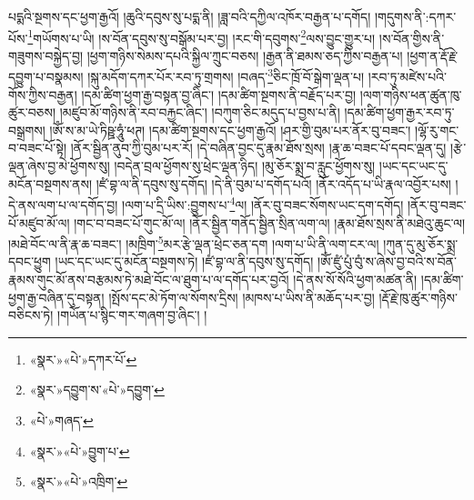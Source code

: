 པདྨའི་སྔགས་དང་ཕྱག་རྒྱའོ། །ཆུའི་དབུས་སུ་པདྨ་ནི། །ཟླ་བའི་དཀྱིལ་འཁོར་བརྒྱན་པ་དགོད། །གདུགས་ནི་:དཀར་པོས་\footnote{«སྣར་»«པེ་»དཀར་པོ་}གཡོགས་པ་ཡི། །ས་བོན་དབུས་སུ་བསྒོམ་པར་བྱ། །རང་གི་དབུགས་\footnote{«སྣར་»དབྱུག་ས་«པེ་»དབྱུག་}ལས་བྱུང་གྱུར་པ། །ས་བོན་གྱིས་ནི་གཟུགས་བསྐྱེད་བྱ། །ཕྱག་གཉིས་སེམས་དཔའི་སྐྱིལ་ཀྲུང་བཅས། །རྒྱན་ནི་ཐམས་ཅད་ཀྱིས་བརྒྱན་པ། །ཕྱག་ན་རྡོ་རྗེ་དབྱུག་པ་བསྣམས། །སྐུ་མདོག་དཀར་པོར་རབ་ཏུ་གྲགས། །བཞད་\footnote{«པེ་»གཞད་}ཅིང་ཁྲོ་བོ་སྒེག་ལྡན་པ། །རབ་ཏུ་མཛེས་པའི་གོས་ཀྱིས་བརྒྱན། །དམ་ཚིག་ཕྱག་རྒྱ་བསྟན་བྱ་ཞིང་། །དམ་ཚིག་སྔགས་ནི་བརྗོད་པར་བྱ། །ལག་གཉིས་ཕན་ཚུན་ཁུ་ཚུར་བཅས། །མཛུབ་མོ་གཉིས་ནི་རབ་བརྐྱང་ཞིང་། །བཀུག་ཅིང་མདུད་པ་བྱས་པ་ནི། །དམ་ཚིག་ཕྱག་རྒྱར་རབ་ཏུ་བསྒྲགས། །ཨོཾ་ས་མ་ཡེ་ཏིཥྛ་ཧཱུཾ་ཕཊ། །དམ་ཚིག་སྔགས་དང་ཕྱག་རྒྱའོ། །ཤར་གྱི་བུམ་པར་ནོར་བུ་བཟང་། །ལྷོ་རུ་གང་བ་བཟང་པོ་སྟེ། །ནོར་སྦྱིན་ནུབ་ཀྱི་བུམ་པར་རོ། །དེ་བཞིན་བྱང་དུ་རྣམ་ཐོས་སྲས། །རྣ་ཆ་བཟང་པོ་དབང་ལྡན་དུ། །རྩེ་ལྡན་ཞེས་བྱ་མེ་ཕྱོགས་སུ། །བདེན་བྲལ་ཕྱོགས་སུ་ཕྲེང་ལྡན་ཉིད། །མུ་ཅོར་སྨྲ་བ་རླུང་ཕྱོགས་སུ། །ཡང་དང་ཡང་དུ་མངོན་བསྔགས་ནས། །ཛཾ་བྷ་ལ་ནི་དབུས་སུ་དགོད། །དེ་ནི་བུམ་པ་དགོད་པའོ། །ནོར་འདོད་པ་ཡི་རྣལ་འབྱོར་པས། །དེ་ནས་ལག་པ་ལ་དགོད་བྱ། །ལག་པ་དྲི་ཡིས་:བྱུགས་པ་\footnote{«སྣར་»«པེ་»བྱུག་པ་}ལ། །ནོར་བུ་བཟང་སོགས་ཡང་དག་དགོད། །ནོར་བུ་བཟང་པོ་མཛུབ་མོ་ལ། །གང་བ་བཟང་པོ་གུང་མོ་ལ། །ནོར་སྦྱིན་གནོད་སྦྱིན་སྲིན་ལག་ལ། །རྣམ་ཐོས་སྲས་ནི་མཐེའུ་ཆུང་ལ། །མཐེ་བོང་ལ་ནི་རྣ་ཆ་བཟང་། །མཁྲིག་\footnote{«སྣར་»«པེ་»འཁྲིག་}མར་རྩེ་ལྡན་ཕྲེང་ཅན་དག །ལག་པ་ཡི་ནི་ལག་ངར་ལ། །ཀུན་དུ་མུ་ཅོར་སྨྲ་དབང་ཕྱུག །ཡང་དང་ཡང་དུ་མངོན་བསྔགས་ཏེ། །ཛཾ་བྷ་ལ་ནི་དབུས་སུ་དགོད། །ཨོཾ་ཛུཾ་པུཾ་བུཾ་ས་ཞེས་བྱ་བའི་ས་བོན་རྣམས་གུང་མོ་ནས་བརྩམས་ཏེ་མཐེ་བོང་ལ་ཐུག་པ་ལ་དགོད་པར་བྱའོ། །དེ་ནས་སོ་སོའི་ཕྱག་མཚན་ནི། །དམ་ཚིག་ཕྱག་རྒྱ་བཞིན་དུ་བསྟན། །སྤོས་དང་མེ་ཏོག་ལ་སོགས་དྲིས། །མཁས་པ་ཡིས་ནི་མཆོད་པར་བྱ། །རྡོ་རྗེ་ཁུ་ཚུར་གཉིས་བཅིངས་ཏེ། །གཡོན་པ་སྙིང་གར་གཞག་བྱ་ཞིང་། །
